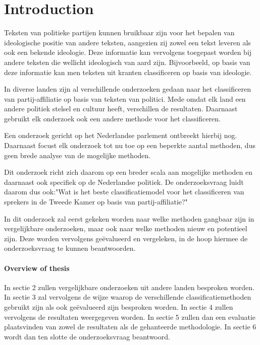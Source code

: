 \section{Introduction}
\label{sec:intro}
Teksten van politieke partijen kunnen bruikbaar zijn voor het bepalen van ideologische positie van andere teksten, aangezien zij zowel een tekst leveren als ook een bekende ideologie. Deze informatie kan vervolgens toegepast worden bij andere teksten die wellicht ideologisch van aard zijn. Bijvoorbeeld, op basis van deze informatie kan men teksten uit kranten classificeren op basis van ideologie.\par
In diverse landen zijn al verschillende onderzoeken gedaan naar het classificeren van partij-affiliatie op basis van teksten van politici.\cite{Ferreira2016UsingTT} Mede omdat elk land een andere politiek stelsel en cultuur heeft, verschillen de resultaten. Daarnaast gebruikt elk onderzoek ook een andere methode voor het classificeren. \par
Een onderzoek gericht op het Nederlandse parlement ontbreekt hierbij nog. Daarnaast focust elk onderzoek tot nu toe op een beperkte aantal methoden, dus geen brede analyse van de mogelijke methoden. \par
Dit onderzoek richt zich daarom op een breder scala aan mogelijke methoden en daarnaast ook specifiek op de Nederlandse politiek. De onderzoeksvraag luidt daarom dus ook:"Wat is het beste classificatiemodel voor het classificeren van sprekers in de Tweede Kamer op basis van partij-affiliatie?"\par
In dit onderzoek zal eerst gekeken worden naar welke methoden gangbaar zijn in vergelijkbare onderzoeken, maar ook naar welke methoden nieuw en potentieel zijn. Deze worden vervolgens geëvalueerd en vergeleken, in de hoop hiermee de onderzoeksvraag te kunnen beantwoorden.


\paragraph{Overview of thesis}
In sectie 2 zullen vergelijkbare onderzoeken uit andere landen besproken worden. In sectie 3 zal vervolgens de wijze waarop de verschillende classificatiemethoden gebruikt zijn als ook geëvalueerd zijn besproken worden. In sectie 4 zullen vervolgens de resultaten weergegeven worden. In sectie 5 zullen dan een evaluatie plaatsvinden van zowel de resultaten als de gehanteerde methodologie. In sectie 6 wordt dan ten slotte de onderzoeksvraag beantwoord.
